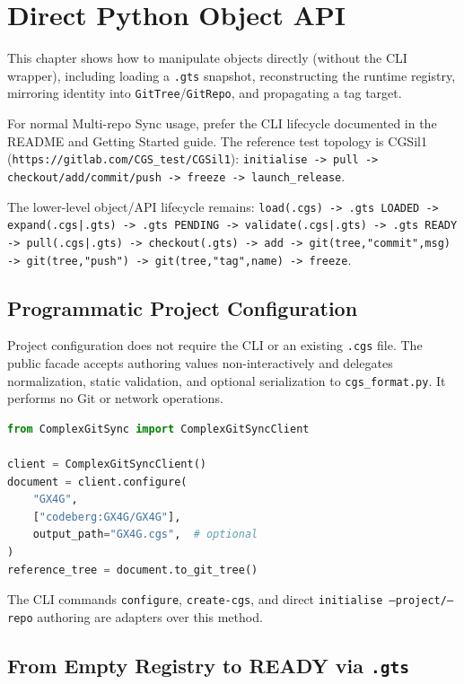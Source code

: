 
\chapter{Direct Python Object API}
\label{chap:python-api}

This chapter shows how to manipulate \cgspkg{} objects directly (without the
CLI wrapper), including loading a \texttt{.gts} snapshot, reconstructing the
runtime registry, mirroring identity into \texttt{GitTree}/\texttt{GitRepo},
and propagating a tag target.

For normal Multi-repo Sync usage, prefer the CLI lifecycle documented in the
README and Getting Started guide. The reference test topology is CGSil1
(\texttt{https://gitlab.com/CGS\_test/CGSil1}):
\texttt{initialise -> pull -> checkout/add/commit/push -> freeze -> launch\_release}.

The lower-level object/API lifecycle remains:
\texttt{load(.cgs) -> .gts LOADED -> expand(.cgs|.gts) -> .gts PENDING ->
validate(.cgs|.gts) -> .gts READY -> pull(.cgs|.gts) -> checkout(.gts) ->
add -> git(tree,"commit",msg) -> git(tree,"push") -> git(tree,"tag",name) ->
freeze}.

\section{Programmatic Project Configuration}

Project configuration does not require the CLI or an existing \texttt{.cgs}
file. The public facade accepts authoring values non-interactively and delegates
normalization, static validation, and optional serialization to
\texttt{cgs\_format.py}. It performs no Git or network operations.

\begin{lstlisting}[language=Python]
from ComplexGitSync import ComplexGitSyncClient

client = ComplexGitSyncClient()
document = client.configure(
    "GX4G",
    ["codeberg:GX4G/GX4G"],
    output_path="GX4G.cgs",  # optional
)
reference_tree = document.to_git_tree()
\end{lstlisting}

The CLI commands \texttt{configure}, \texttt{create-cgs}, and direct
\texttt{initialise --project/--repo} authoring are adapters over this method.

\section{From Empty Registry to READY via \texttt{.gts}}

